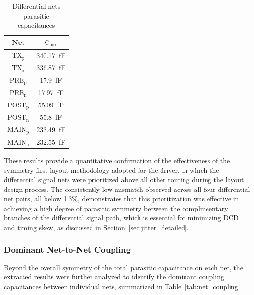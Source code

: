\begin{table}[htbp]
 \centering
 \caption{Differential nets parasitic capacitances}
 \label{tab:parasitic_capacitances}
 \begin{tabular}{cc}
  \hline \hline
  \textbf{Net} & \textbf{$\mathrm{C_{par}}$}\\
  \hline
  $\mathrm{TX_p}$ 		& 	\SI{340.17}{\femto\farad}		\\
  $\mathrm{TX_n}$ 		& 	\SI{336.87}{\femto\farad} 		\\
  $\mathrm{PRE_p}$ 		& 	\SI{17.9}{\femto\farad} 		\\
  $\mathrm{PRE_n}$ 		& 	\SI{17.97}{\femto\farad} 		\\
  $\mathrm{POST_p}$ 	& 	\SI{55.09}{\femto\farad} 		\\
  $\mathrm{POST_n}$ 	& 	\SI{55.8}{\femto\farad} 		\\
  $\mathrm{MAIN_p}$ 	& 	\SI{233.49}{\femto\farad}		\\
  $\mathrm{MAIN_n}$ 	& 	\SI{232.55}{\femto\farad} 		\\
  \hline \hline
 \end{tabular}
\end{table}

These results provide a quantitative confirmation of the effectiveness of the symmetry-first layout methodology adopted for the driver, in which the differential signal nets were prioritized above all other routing during the layout design process. The consistently low mismatch observed across all four differential net pairs, all below 1.3\%, demonstrates that this prioritization was effective in achieving a high degree of parasitic symmetry between the complmeentary branches of the differential signal path, which is essential for minimizing \ac{DCD} and timing skew, as discussed in Section~\ref{sec:jitter_detailed}.

\subsubsection{Dominant Net-to-Net Coupling}
\label{sec:net_coupling_analysis}

Beyond the overall symmetry of the total parasitic capacitance on each net, the extracted results were further analyzed to identify the dominant coupling capacitances between individual nets, summarized in Table~\ref{tab:net_coupling}.

